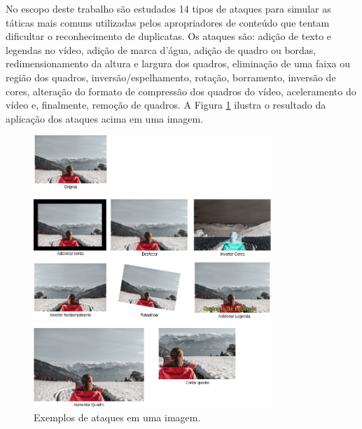 	No escopo deste trabalho são estudados 14 tipos de ataques para simular as táticas mais comuns utilizadas pelos apropriadores de conteúdo que tentam dificultar o reconhecimento de duplicatas. Os ataques são: adição de texto e legendas no vídeo, adição de marca d'água, adição de quadro ou bordas, redimensionamento da altura e largura dos quadros, eliminação de uma faixa ou região dos quadros, inversão/espelhamento, rotação, borramento, inversão de cores, alteração do formato de compressão dos quadros do vídeo, aceleramento do vídeo e, finalmente, remoção de quadros. A Figura \ref{fig:ataques} ilustra o resultado da aplicação dos ataques acima em uma imagem.

    	\begin{figure}[h]
        \centering
         \caption{Exemplos de ataques em uma imagem.}
        \includegraphics[width=0.8\textwidth]{dados/figuras/Ataques.png}
       
        
    	\label{fig:ataques}
    \end{figure}

